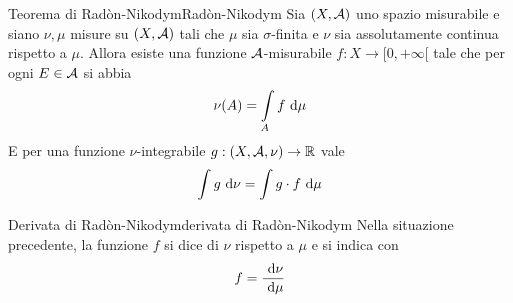 \documentclass{article}
\begin{document}
\begin{theorem}{Teorema di Radòn-Nikodym}{Radòn-Nikodym}
    Sia $(X,\mathcal{A})$ uno spazio misurabile e siano $\nu, \mu$ misure su $(X,\mathcal{A})$ tali che $\mu$ sia $\sigma$-finita e $\nu$ sia assolutamente continua rispetto a $\mu$. Allora esiste una funzione $\mathcal{A}$-misurabile $f: X \to [0,+\infty[$ tale che per ogni $E \in \mathcal{A}$ si abbia
    \[\nu(A) = \intop_A f \de \mu \]
    E per una funzione $\nu$-integrabile $g : (X,\mathcal{A},\nu)\to \mathbb{R}$ vale
    \[\intop g \de \nu = \intop g \cdot f \de \mu\]
\end{theorem}
\begin{definition}{Derivata di Radòn-Nikodym}{derivata di Radòn-Nikodym}
    Nella situazione precedente, la funzione $f$ si dice  di $\nu$ rispetto a $\mu$ e si indica con
    \[f = \frac{\text{ d} \nu}{\text{ d} \mu}\]
\end{definition}

\end{document}
